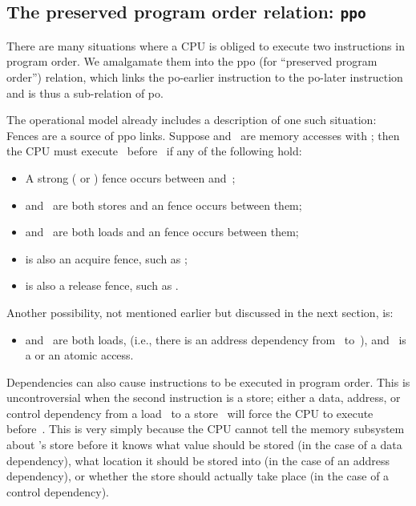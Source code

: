 \subsection{The preserved program order relation: \texttt{ppo}}
\label{sec:docs:explanation:The preserved program order relation: ppo}

There are many situations where a CPU is obliged to execute two
instructions in program order.
We amalgamate them into the ppo (for ``preserved program order'')
relation, which links the po-earlier instruction to the po-later
instruction and is thus a sub-relation of po.

The operational model already includes a description of one such
situation:
Fences are a source of ppo links.
Suppose  and~ are memory accesses with ;
then the CPU must execute~ before~ if any of the following hold:

\begin{itemize}
\item	A strong ( or ) fence occurs between
	 and~;

\item	{} and~ are both stores and an  fence occurs between
	them;

\item	{} and~ are both loads and an  fence occurs between
	them;

\item	{} is also an acquire fence, such as ;

\item	{} is also a release fence, such as .
\end{itemize}

Another possibility, not mentioned earlier but discussed in the next
section, is:

\begin{itemize}
\item	{} and~ are both loads,  (i.e., there is an address
	dependency from~ to~), and ~is a  or an atomic
	access.
\end{itemize}

Dependencies can also cause instructions to be executed in program
order.
This is uncontroversial when the second instruction is a
store; either a data, address, or control dependency from a load~ to
a store~ will force the CPU to execute  before~.
This is very
simply because the CPU cannot tell the memory subsystem about 's
store before it knows what value should be stored (in the case of a
data dependency), what location it should be stored into (in the case
of an address dependency), or whether the store should actually take
place (in the case of a control dependency).

